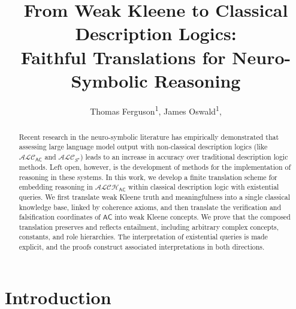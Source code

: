 \documentclass[letterpaper]{article} %
\title{From Weak Kleene to Classical Description Logics: \\Faithful Translations for Neuro-Symbolic Reasoning}
\author {{
    Thomas Ferguson\textsuperscript{\rm 1},
    James Oswald\textsuperscript{\rm 1},
}}
\theoremstyle{definition}
\theoremstyle{definition}
\theoremstyle{definition}
\theoremstyle{definition}
\theoremstyle{definition}
\begin{document}
\maketitle

\begin{abstract}

Recent research in the neuro-symbolic literature has empirically demonstrated that assessing large language model output with non-classical description logics (like $\mathcal{ALC}_\mathsf{AC}$ and $\mathcal{ALC}_{S^\star}$) leads to an increase in accuracy over traditional description logic methods. Left open, however, is the development of methods for the implementation of reasoning in these systems. In this work, we develop a finite translation scheme for embedding reasoning in $\mathcal{ALCH}_{\mathsf{AC}}$ within classical description logic with existential queries. We first translate weak Kleene truth and meaningfulness into a single classical knowledge base, linked by coherence axioms, and then translate the verification and falsification coordinates of $\mathsf{AC}$ into weak Kleene concepts. We prove that the composed translation preserves and reflects entailment, including arbitrary complex concepts, constants, and role hierarchies. The interpretation of existential queries is made explicit, and the proofs construct associated interpretations in both directions.

\end{abstract}


\section{Introduction}

\end{document}
